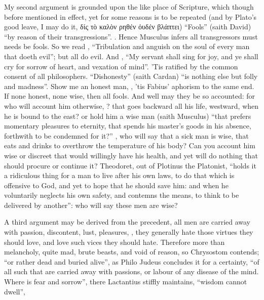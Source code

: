 My second argument is grounded upon the like place of Scripture, which though
before mentioned in effect, yet for some reasons is to be repeated (and by
Plato's good leave, I may do it, \textgreek{δίς τὸ καλὸν
ρηθέν ὀυδέν βλάπτει}) \enquote{Fools} (saith David) \enquote{by reason of their
transgressions}. \etc{} . Hence Musculus infers
all transgressors must needs be fools. So we read ,
\enquote{Tribulation and anguish on the soul of every man that doeth evil}; but all do
evil. And , \enquote{My servant shall sing for joy, and
ye shall cry for sorrow of heart, and vexation of mind}.
'Tis ratified by the common consent of all philosophers. \enquote{Dishonesty} (saith
Cardan) \enquote{is nothing else but folly and madness}.  Show me an honest man,
, 'tis Fabius' aphorism to the same end. If none
honest, none wise, then all fools. And well may they be so accounted: for who
will account him otherwise, ? that goes backward all his life, westward, when he is bound to
the east? or hold him a wise man (saith Musculus) \enquote{that
prefers momentary pleasures to eternity, that spends his master's goods in his
absence, forthwith to be condemned for it?} , who will say that a sick man is wise, that eats and drinks to overthrow
the temperature of his body? Can you account him wise or discreet that would
willingly have his health, and yet will do nothing that should procure or
continue it? Theodoret, out of Plotinus the Platonist,
\enquote{holds it a ridiculous thing for a man to live after his own laws, to do that
which is offensive to God, and yet to hope that he should save him: and when he
voluntarily neglects his own safety, and contemns the means, to think to be
delivered by another}: who will say these men are wise?

A third argument may be derived from the precedent, all men
are carried away with passion, discontent, lust, pleasures, \etc{}, they
generally hate those virtues they should love, and love such vices they should
hate. Therefore more than melancholy, quite mad, brute beasts, and void of
reason, so Chrysostom contends; \enquote{or rather dead and buried alive}, as
Philo Judeus concludes it for a certainty, \enquote{of all such
that are carried away with passions, or labour of any disease of the mind.
Where is fear and sorrow}, there Lactantius stiffly
maintains, \enquote{wisdom cannot dwell},

